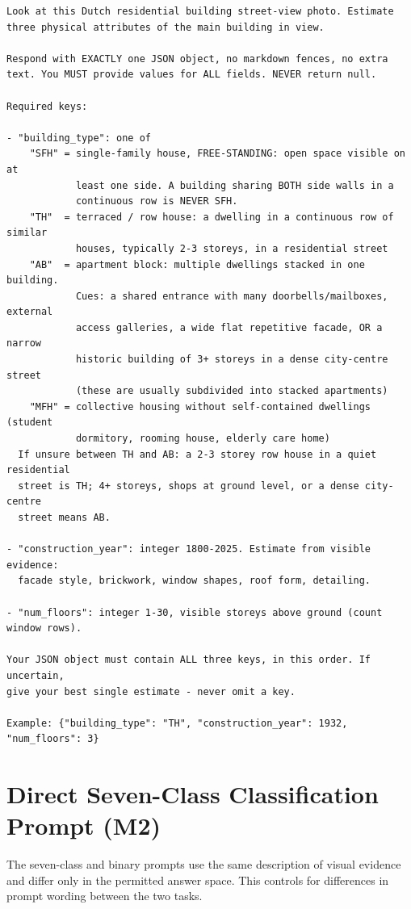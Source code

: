 \begin{lstlisting}[keywords={},mathescape=false,basicstyle=\ttfamily\footnotesize,breaklines=true]
Look at this Dutch residential building street-view photo. Estimate three physical attributes of the main building in view.

Respond with EXACTLY one JSON object, no markdown fences, no extra text. You MUST provide values for ALL fields. NEVER return null.

Required keys:

- "building_type": one of
    "SFH" = single-family house, FREE-STANDING: open space visible on at
            least one side. A building sharing BOTH side walls in a
            continuous row is NEVER SFH.
    "TH"  = terraced / row house: a dwelling in a continuous row of similar
            houses, typically 2-3 storeys, in a residential street
    "AB"  = apartment block: multiple dwellings stacked in one building.
            Cues: a shared entrance with many doorbells/mailboxes, external
            access galleries, a wide flat repetitive facade, OR a narrow
            historic building of 3+ storeys in a dense city-centre street
            (these are usually subdivided into stacked apartments)
    "MFH" = collective housing without self-contained dwellings (student
            dormitory, rooming house, elderly care home)
  If unsure between TH and AB: a 2-3 storey row house in a quiet residential
  street is TH; 4+ storeys, shops at ground level, or a dense city-centre
  street means AB.

- "construction_year": integer 1800-2025. Estimate from visible evidence:
  facade style, brickwork, window shapes, roof form, detailing.

- "num_floors": integer 1-30, visible storeys above ground (count window rows).

Your JSON object must contain ALL three keys, in this order. If uncertain,
give your best single estimate - never omit a key.

Example: {"building_type": "TH", "construction_year": 1932, "num_floors": 3}
\end{lstlisting}

\section{Direct Seven-Class Classification Prompt (M2)}
\label{sec:appendix_c_sevenclass_prompt}

The seven-class and binary prompts use the same description of visual evidence and differ only in the permitted answer space.
This controls for differences in prompt wording between the two tasks.

